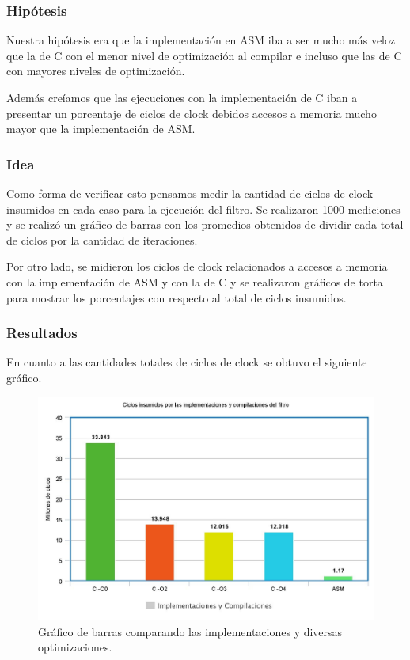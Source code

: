 \subsubsection{Hipótesis}
\par{Nuestra hipótesis era que la implementación en ASM iba a ser mucho más veloz que la de C con el menor nivel de optimización al compilar e incluso que las de C con mayores niveles de optimización.}
\par{Además creíamos que las ejecuciones con la implementación de C iban a presentar un porcentaje de ciclos de clock debidos accesos a memoria mucho mayor que la implementación de ASM.}

\subsubsection{Idea}
\par{Como forma de verificar esto pensamos medir la cantidad de ciclos de clock insumidos en cada caso para la ejecución del filtro. Se realizaron 1000 mediciones y se realizó un gráfico de barras con los promedios obtenidos de dividir cada total de ciclos por la cantidad de iteraciones.}
\par{Por otro lado, se midieron los ciclos de clock relacionados a accesos a memoria con la implementación de ASM y con la de C y se realizaron gráficos de torta para mostrar los porcentajes con respecto al total de ciclos insumidos.}

\subsubsection{Resultados}
\par{En cuanto a las cantidades totales de ciclos de clock se obtuvo el siguiente gráfico.}

\begin{figure}[h!]
\centering
	\includegraphics[width = 12 cm, height = 8 cm]{imagenes/CombinarASM-Cs.jpeg}
	\caption[center]{Gráfico de barras comparando las implementaciones y diversas optimizaciones.}
\end{figure}

